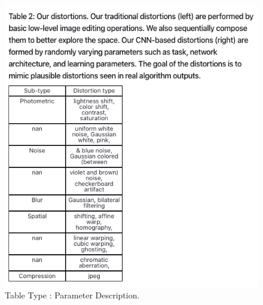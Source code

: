 \begin{figure}[h!]
    \centering
    \includegraphics[width=\maxwidth{\textwidth}]{src/images/type-exp-param.png}
    \caption{Table Type : Parameter Description.}
    \label{figure\arabic{figurecounter}}
\end{figure}

